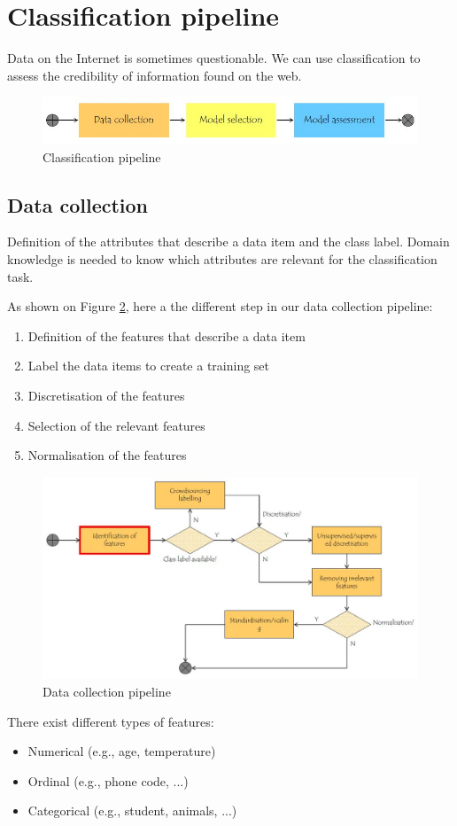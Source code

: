 \section{Classification pipeline}
Data on the Internet is sometimes questionable. We can use classification to assess the credibility of information found on the web.

\begin{figure}[!ht]
  \centering
  \includegraphics[width=0.8\linewidth]{figures/classification_pipeline}
  \caption{Classification pipeline}
  \label{fig:classificationPipeline}
\end{figure}

\subsection*{Data collection}
Definition of the attributes that describe a data item and the class label. Domain knowledge is needed to know which attributes are relevant for the classification task.

As shown on Figure \ref{fig:dataCollection}, here a the different step in our data collection pipeline:
\begin{enumerate}
	\item Definition of the features that describe a data item
	\item Label the data items to create a training set
	\item Discretisation of the features
	\item Selection of the relevant features
	\item Normalisation of the features
\end{enumerate}

\begin{figure}[!ht]
  \centering
  \includegraphics[width=0.8\linewidth]{figures/data_collection}
  \caption{Data collection pipeline}
  \label{fig:dataCollection}
\end{figure}
There exist different types of features:
\begin{itemize}
	\item Numerical (e.g., age, temperature)
	\item Ordinal (e.g., phone code, ...)
	\item Categorical (e.g., student, animals, ...)
\end{itemize}

